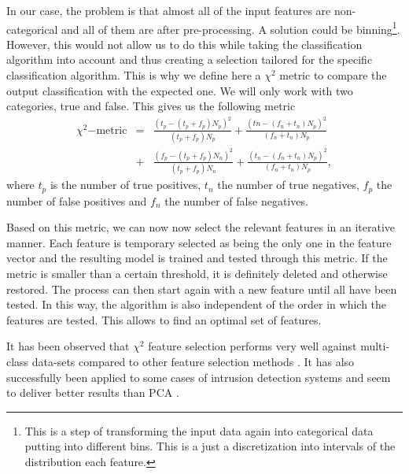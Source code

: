 In our case, the problem is that almost all of the input features are non-categorical and all of them are after pre-processing. A solution could be binning\footnote{This is a step of transforming the input data again into categorical data putting into different bins. This is a just a discretization into intervals of the distribution each feature.}. However, this would not allow us to do this while taking the classification algorithm into account and thus creating a selection tailored for the specific classification algorithm. This is why we define here a $\chi^2$ metric to compare the output classification with the expected one. We will only work with two categories, true and false. This gives us the following metric
\begin{eqnarray}
    \chi^2\mathrm{-metric} &=& \frac{\left(t_p - (t_p+f_p)N_p \right)^2}{(t_p+f_p)N_p} + \frac{\left(tn - (f_n+t_n)N_p \right)^2}{(f_n+t_n)N_p} \\
    &+& \frac{\left(f_p - (t_p+f_p)N_n \right)^2}{ (t_p+f_p)N_n} + \frac{\left(t_n-(f_n+t_n)N_p \right)^2}{(f_n+t_n)N_p},
\end{eqnarray}
where $t_p$ is the number of true positives, $t_n$ the number of true negatives, $f_p$ the number of false positives and $f_n$ the number of false negatives.

Based on this metric, we can now now select the relevant features in an iterative manner. Each feature is temporary selected as being the only one in the feature vector and the resulting model is trained and tested through this metric. If the metric is smaller than a certain threshold, it is definitely deleted and otherwise restored. The process can then start again with a new feature until all have been tested. In this way, the algorithm is also independent of the order in which the features are tested. This allows to find an optimal set of features.

It has been observed that $\chi^2$ feature selection performs very well against multi-class data-sets compared to other feature selection methods \cite{Yang:1997:CSF:645526.657137}. It has also successfully been applied to some cases of intrusion detection systems and seem to deliver better results than PCA \cite{SumaiyaThaseen2017IntrusionSVM}.